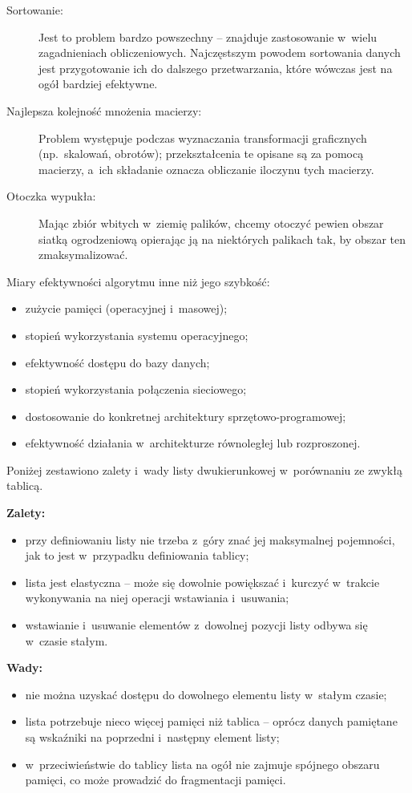 
\exercise %
\begin{description}
	\item[Sortowanie:] Jest to problem bardzo powszechny -- znajduje zastosowanie w~wielu zagadnieniach obliczeniowych.
Najczęstszym powodem sortowania danych jest przygotowanie ich do dalszego przetwarzania, które wówczas jest na ogół bardziej efektywne.
	\item[Najlepsza kolejność mnożenia macierzy:] Problem występuje podczas wyznaczania transformacji graficznych (np.\ skalowań, obrotów); przekształcenia te opisane są za pomocą macierzy, a~ich składanie oznacza obliczanie iloczynu tych macierzy.
	\item[Otoczka wypukła:] Mając zbiór wbitych w~ziemię palików, chcemy otoczyć pewien obszar siatką ogrodzeniową opierając ją na niektórych palikach tak, by obszar ten zmaksymalizować.
\end{description}

\exercise %
Miary efektywności algorytmu inne niż jego szybkość:
\begin{itemize}
	\item zużycie pamięci (operacyjnej i~masowej);
	\item stopień wykorzystania systemu operacyjnego;
	\item efektywność dostępu do bazy danych;
	\item stopień wykorzystania połączenia sieciowego;
	\item dostosowanie do konkretnej architektury sprzętowo-programowej;
	\item efektywność działania w~architekturze równoległej lub rozproszonej.
\end{itemize}

\exercise %
Poniżej zestawiono zalety i~wady listy dwukierunkowej w~porównaniu ze zwykłą tablicą.

\bigskip
\noindent\textbf{Zalety:}
\begin{itemize}
	\item przy definiowaniu listy nie trzeba z~góry znać jej maksymalnej pojemności, jak to jest w~przypadku definiowania tablicy;
	\item lista jest elastyczna -- może się dowolnie powiększać i~kurczyć w~trakcie wykonywania na niej operacji wstawiania i~usuwania;
	\item wstawianie i~usuwanie elementów z~dowolnej pozycji listy odbywa się w~czasie stałym.
\end{itemize}
\bigskip
\noindent\textbf{Wady:}
\begin{itemize}
	\item nie można uzyskać dostępu do dowolnego elementu listy w~stałym czasie;
	\item lista potrzebuje nieco więcej pamięci niż tablica -- oprócz danych pamiętane są wskaźniki na poprzedni i~następny element listy;
	\item w~przeciwieństwie do tablicy lista na ogół nie zajmuje spójnego obszaru pamięci, co może prowadzić do fragmentacji pamięci.
\end{itemize}

